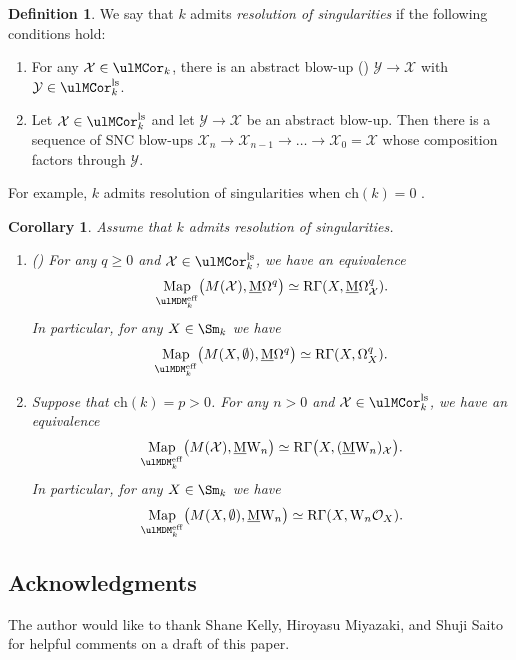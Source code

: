 \documentclass{amsart}
\theoremstyle{plain}
\newtheorem{corollary}[theorem]{Corollary}
\theoremstyle{definition}
\newtheorem{definition}[theorem]{Definition}
\theoremstyle{remark}
\numberwithin{equation}{section}
\DeclareMathOperator{\Map}{Map}
\def\eff{\mathrm{eff}}
\def\ch{\mathrm{ch}}
\def\ls{\mathrm{ls}}
\def\MOmega{\underline{\mathrm{M}}\Omega}
\def\MW{\underline{\mathrm{M}}\mathrm{W}}
\begin{document}
\begin{definition}\label{def:resolution}
	We say that $k$ admits \emph{resolution of singularities} if the following conditions hold:
	\begin{enumerate}
		\item[(RS1)]	For any $\mathcal{X}\in \ulMCor_k$, there is an abstract blow-up () $\mathcal{Y}\to \mathcal{X}$ with $\mathcal{Y}\in \ulMCor_k^\ls$.
		\item[(RS2)]	Let $\mathcal{X}\in \ulMCor_k^\ls$ and let $\mathcal{Y}\to \mathcal{X}$ be an abstract blow-up.
						Then there is a sequence of SNC blow-ups $\mathcal{X}_n\to \mathcal{X}_{n-1}\to\dots\to \mathcal{X}_0=\mathcal{X}$ whose composition factors through $\mathcal{Y}$.
	\end{enumerate}
\end{definition}

For example, $k$ admits resolution of singularities when $\ch(k)=0$ \cite{Hironaka1964}.


\begin{corollary}\label{cor:realization}
	Assume that $k$ admits resolution of singularities.
	\begin{enumerate}
		\item	(\cite[Theorem 1.3]{KellyMiyazaki_Hodge2}) For any $q\geq 0$ and $\mathcal{X}\in \ulMCor^\ls_k$, we have an equivalence
				$$
					\Map_{\ulMDM^\eff_k}\bigl(M(\mathcal{X}),\MOmega^q\bigr) \simeq \mathrm{R}\Gamma(X,\MOmega^q_\mathcal{X}).
				$$
				In particular, for any $X\in \Sm_k$ we have
				$$
					\Map_{\ulMDM^\eff_k}\bigl(M(X,\emptyset),\MOmega^q\bigr) \simeq \mathrm{R}\Gamma(X,\Omega^q_X).
				$$
		\item	Suppose that $\ch(k)=p>0$.
				For any $n>0$ and $\mathcal{X}\in \ulMCor^\ls_k$, we have an equivalence
				$$
					\Map_{\ulMDM^\eff_k}\bigl(M(\mathcal{X}),\MW_n\bigr) \simeq \mathrm{R}\Gamma\bigl(X,(\MW_n)_\mathcal{X}\bigr).
				$$
				In particular, for any $X\in \Sm_k$ we have
				$$
					\Map_{\ulMDM^\eff_k}\bigl(M(X,\emptyset),\MW_n\bigr) \simeq \mathrm{R}\Gamma(X,\mathrm{W}_n\mathcal{O}_X).
				$$
	\end{enumerate}
\end{corollary}

\subsection*{Acknowledgments}
The author would like to thank Shane Kelly, Hiroyasu Miyazaki, and Shuji Saito for helpful comments on a draft of this paper.
\end{document}
